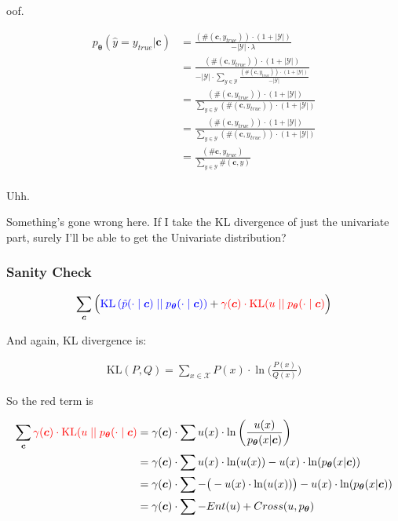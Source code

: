 \documentclass{article}
\newcommand{\KL}{\mathrm{KL}}
\newcommand{\uniform}{u}
\newcommand{\vtheta}{\boldsymbol{\theta}}
\newcommand{\model}{p_{\vtheta}}
\newcommand{\context}{\boldsymbol{c}}
\begin{document}
		oof.
		
		\begin{align}
			\model(\hat{y} = y_{true}|\context) &= \frac{(\#(\context, y_{true}))\cdot (1 + |\mathcal{Y}|)}{- |\mathcal{Y}|\cdot \lambda}\\
			&= \frac{(\#(\context, y_{true}))\cdot (1 + |\mathcal{Y}|)}{- |\mathcal{Y}|\cdot \sum_{y\in\mathcal{Y}} \frac{(\#(\context, y_{true}))\cdot (1 + |\mathcal{Y}|)}{- |\mathcal{Y}| }}\\
			&= \frac{(\#(\context, y_{true}))\cdot (1 + |\mathcal{Y}|)}{\sum_{y\in\mathcal{Y}} (\#(\context, y_{true}))\cdot (1 + |\mathcal{Y}|)}\\
			&= \frac{(\#(\context, y_{true}))\cdot (1 + |\mathcal{Y}|)}{\sum_{y\in\mathcal{Y}} (\#(\context, y_{true}))\cdot (1 + |\mathcal{Y}|)}\\
			&= \frac{(\#\context, y_{true})}{\sum_{y\in\mathcal{Y}} \#(\context, y)}\\
		\end{align}
		
		Uhh.
		
		Something's gone wrong here. If I take the KL divergence of just the univariate part, surely I'll be able to get the Univariate distribution?
		
		\subsubsection{Sanity Check}
		
			\begin{align}
		  		 \sum_{\context} \Big( {\color{blue} \KL\left(\tilde{p}(\cdot 			\mid \context) \mid\mid \model(\cdot \mid \context)					\right)} + {\color{red}\gamma(\context) \cdot 						\KL(\uniform \mid\mid \model(\cdot \mid \context)}\Big)
			\end{align}
			
			And again, KL divergence is:
			
			\begin{align}
				\KL(P, Q) = \sum_{x\in\mathcal{X}} P(x)\cdot \ln\bigg(\frac{P(x)}{Q(x)}\bigg)
			\end{align}
		
			So the red term is
			
			\begin{align}
				\sum_{\context} {\color{red}\gamma(\context) \cdot 						\KL(\uniform \mid\mid \model(\cdot \mid \context)} &= \gamma(\context)\cdot\sum u(x)\cdot \ln\bigg(\frac{u(x)}{\model(x|\context)}\bigg)\\
			&= \gamma(\context)\cdot\sum u(x)\cdot\ln(u(x)) - u(x)\cdot\ln(\model(x|\context))\\
				&= \gamma(\context)\cdot\sum -\big(-u(x)\cdot\ln(u(x))\big) - u(x)\cdot\ln(\model(x|\context))\\
				&= \gamma(\context)\cdot\sum -Ent(u) + Cross(u, \model)
			\end{align}
			
\end{document}
